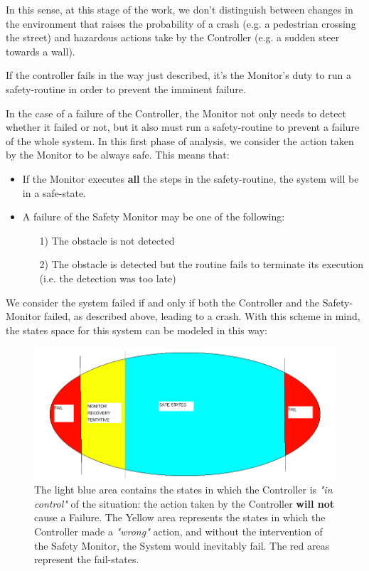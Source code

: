 In this sense, at this stage of the work, we don't distinguish between changes in the environment that raises the probability of a crash (e.g. a pedestrian crossing the street) and hazardous actions take by the Controller (e.g. a sudden steer towards a wall).

If the controller fails in the way just described, it's the Monitor's duty to run a safety-routine in order to prevent the imminent failure.\newline

In the case of a failure of the Controller, the Monitor not only needs to detect whether it failed or not, but it also must run a safety-routine to prevent a failure of the whole system. In this first phase of analysis, we consider the action taken by the Monitor to be always safe. This means that:

\begin{itemize}
	\item If the Monitor executes \textbf{all} the steps in the safety-routine, the system will be in a safe-state.
	\item A failure of the Safety Monitor may be one of the following:
	\begin{itemize}
		\item[1)] The obstacle is not detected
		\item[2)] The obstacle is detected but the routine fails to terminate its execution (i.e. the detection was too late)
	\end{itemize}
\end{itemize}

We consider the system failed if and only if both the Controller and the Safety-Monitor failed, as described above, leading to a crash.
With this scheme in mind, the states space for this system can be modeled in this way:

\begin{figure}[h!]
	\includegraphics[width=\textwidth]{img/state-space-true.png}
	\caption{The light blue area contains the states in which the Controller is \textsl{"in control"} of the situation: the action taken by the Controller \textbf{will not} cause a Failure. The Yellow area represents the states in which the Controller made a \textsl{"wrong"} action, and without the intervention of the Safety Monitor, the System would inevitably fail. The red areas represent the fail-states.}
\end{figure}


